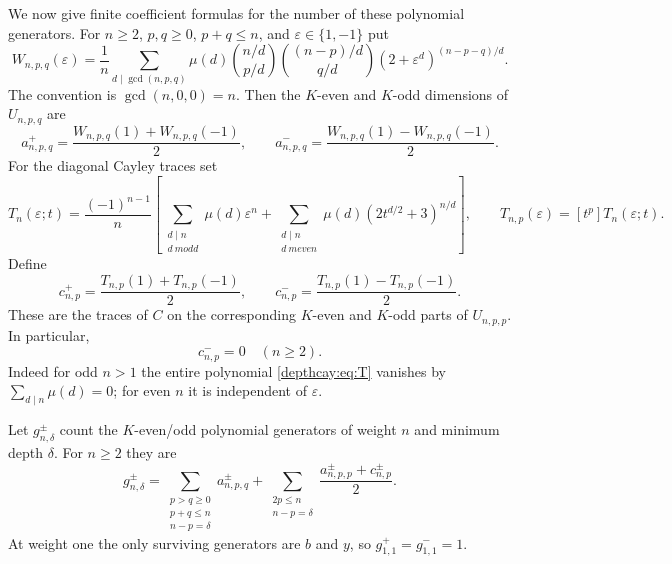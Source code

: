 We now give finite coefficient formulas for the number of these
polynomial generators. For $n\ge2$, $p,q\ge0$, $p+q\le n$, and
$\varepsilon\in\{1,-1\}$ put
\begin{equation}\label{depthcay:eq:W}
 W_{n,p,q}(\varepsilon)=\frac1n
 \sum_{d\mid\gcd(n,p,q)}\mu(d)
 \binom{n/d}{p/d}\binom{(n-p)/d}{q/d}
 (2+\varepsilon^d)^{(n-p-q)/d}.
\end{equation}
The convention is $\gcd(n,0,0)=n$.
Then the $K$-even and $K$-odd dimensions of $U_{n,p,q}$ are
\begin{equation}\label{depthcay:eq:a}
 a^+_{n,p,q}=\frac{W_{n,p,q}(1)+W_{n,p,q}(-1)}2,
 \qquad
 a^-_{n,p,q}=\frac{W_{n,p,q}(1)-W_{n,p,q}(-1)}2.
\end{equation}
For the diagonal Cayley traces set
\begin{equation}\label{depthcay:eq:T}
 T_n(\varepsilon;t)=\frac{(-1)^{n-1}}n
 \left[
 \sum_{\substack{d\mid n\\d\ {
m odd}}}\mu(d)\varepsilon^n
 +\sum_{\substack{d\mid n\\d\ {
m even}}}\mu(d)
       (2t^{d/2}+3)^{n/d}\right],
 \qquad T_{n,p}(\varepsilon)=[t^p]T_n(\varepsilon;t).
\end{equation}
Define
\[
 c^+_{n,p}=\frac{T_{n,p}(1)+T_{n,p}(-1)}2,\qquad
 c^-_{n,p}=\frac{T_{n,p}(1)-T_{n,p}(-1)}2.
\]
These are the traces of $C$ on the corresponding $K$-even and $K$-odd
parts of $U_{n,p,p}$. In particular,
\begin{equation}\label{depthcay:eq:oddtracezero}
 c^-_{n,p}=0\quad(n\ge2).
\end{equation}
Indeed for odd $n>1$ the entire polynomial \eqref{depthcay:eq:T}
vanishes by $\sum_{d\mid n}\mu(d)=0$; for even $n$ it is independent
of $\varepsilon$.

Let $g^\pm_{n,\delta}$ count the $K$-even/odd polynomial generators
of weight $n$ and minimum depth $\delta$. For $n\ge2$ they are
\begin{equation}\label{depthcay:eq:generators}
 g^\pm_{n,\delta}
 =\sum_{\substack{p>q\ge0\\p+q\le n\\n-p=\delta}}a^\pm_{n,p,q}
 +\sum_{\substack{2p\le n\\n-p=\delta}}
     \frac{a^\pm_{n,p,p}+c^\pm_{n,p}}2.
\end{equation}
At weight one the only surviving generators are $b$ and $y$, so
$g^+_{1,1}=g^-_{1,1}=1$.

